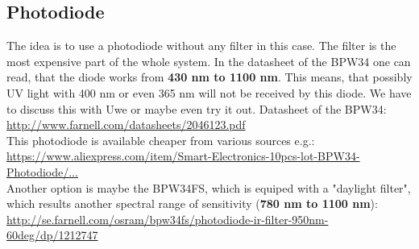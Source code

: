 \documentclass{article}
\begin{document}
\subsection{Photodiode}
The idea is to use a photodiode without any filter in this case. The filter is the most expensive part of the whole system. In the datasheet of the BPW34 one can read, that the diode works from \textbf{430 nm to 1100 nm}. This means, that possibly UV light with 400 nm or even 365 nm will not be received by this diode. We have to discuss this with Uwe or maybe even try it out. Datasheet of the BPW34:\\
\href{http://www.farnell.com/datasheets/2046123.pdf}{http://www.farnell.com/datasheets/2046123.pdf}\\
This photodiode is available cheaper from various sources e.g.:\\
\href{https://www.aliexpress.com/item/Smart-Electronics-10pcs-lot-BPW34-Photodiode/32711869804.html?spm=2114.01010208.3.37.kEUjrU&ws_ab_test=searchweb0_0,searchweb201602_3_10065_10068_10136_10137_10138_10060_10062_10141_10056_10055_10054_122_10059_10099_10103_10102_10096_10052_10053_10050_10107_10142_10051_10143_10084_10083_10080_10082_10081_10110_10111_10112_10113_10114_10078_10079_10073_10070_10123_10124,searchweb201603_2,afswitch_1,ppcSwitch_5,single_sort_0_default&btsid=7135d04f-8309-410c-a0c5-9b6acfaec429&algo_expid=395c0e88-612b-46b8-bc3a-0ed4465fb75e-4&algo_pvid=395c0e88-612b-46b8-bc3a-0ed4465fb75e}{https://www.aliexpress.com/item/Smart-Electronics-10pcs-lot-BPW34-Photodiode/...}\\
Another option is maybe the BPW34FS, which is equiped with a "daylight filter", which results another spectral range of sensitivity (\textbf{780 nm to 1100 nm}):
\href{http://se.farnell.com/osram/bpw34fs/photodiode-ir-filter-950nm-60deg/dp/1212747}{http://se.farnell.com/osram/bpw34fs/photodiode-ir-filter-950nm-60deg/dp/1212747}
\end{document}

